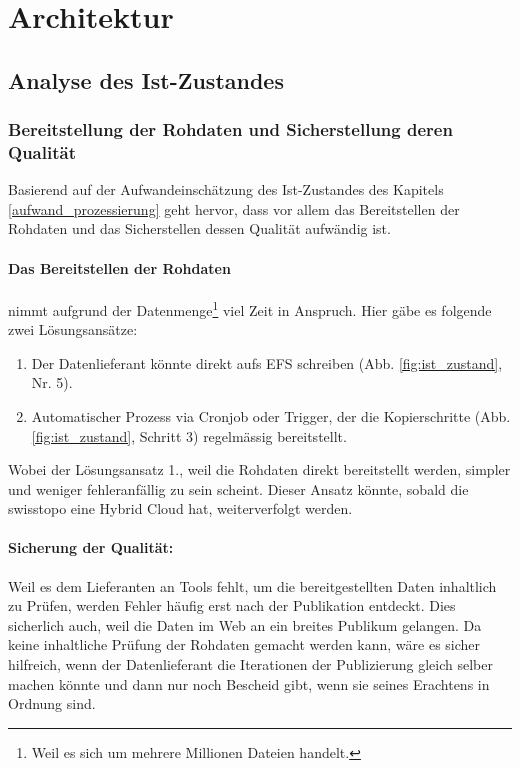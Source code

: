 \section{Architektur}

\subsection{Analyse des Ist-Zustandes}
\subsubsection{Bereitstellung der Rohdaten und Sicherstellung deren Qualität}\label{kap:sicherstellung_qualitaet}
Basierend auf der Aufwandeinschätzung des Ist-Zustandes des Kapitels \ref{aufwand_prozessierung} geht hervor, dass vor allem das Bereitstellen der Rohdaten und das Sicherstellen dessen Qualität aufwändig ist. 

\paragraph{Das Bereitstellen der Rohdaten} nimmt aufgrund der Datenmenge\footnote{Weil es sich um mehrere Millionen Dateien handelt.} viel Zeit in Anspruch. Hier gäbe es folgende zwei Lösungsansätze:
\begin{enumerate}
\item Der Datenlieferant könnte direkt aufs EFS schreiben (Abb. \ref{fig:ist_zustand}, Nr. 5).
\item Automatischer Prozess via Cronjob oder Trigger, der die Kopierschritte (Abb. \ref{fig:ist_zustand}, Schritt 3) regelmässig bereitstellt.
\end{enumerate}

Wobei der Lösungsansatz 1., weil die Rohdaten direkt bereitstellt werden, simpler und weniger fehleranfällig zu sein scheint. Dieser Ansatz könnte, sobald die swisstopo eine Hybrid Cloud hat, weiterverfolgt werden.

\paragraph{Sicherung der Qualität:} Weil es dem Lieferanten an Tools fehlt, um die bereitgestellten Daten inhaltlich zu Prüfen, werden Fehler 
häufig erst nach der Publikation entdeckt. Dies sicherlich auch, weil die Daten im Web an ein breites Publikum gelangen. Da keine inhaltliche Prüfung der Rohdaten gemacht werden kann, wäre es sicher hilfreich, wenn der Datenlieferant die Iterationen der Publizierung gleich selber machen könnte und dann nur noch Bescheid gibt, wenn sie seines Erachtens in Ordnung sind.


